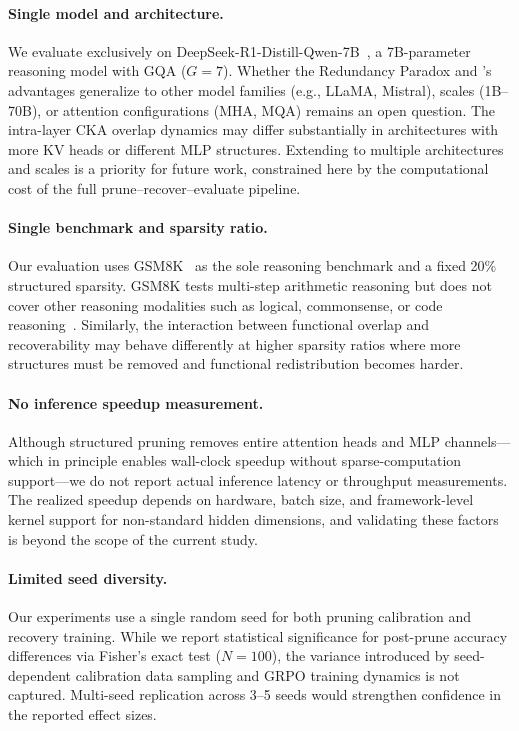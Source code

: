 
\paragraph{Single model and architecture.}
We evaluate \rasp{} exclusively on DeepSeek-R1-Distill-Qwen-7B~\citep{deepseek2025r1}, a 7B-parameter reasoning model with GQA ($G{=}7$).
Whether the Redundancy Paradox and \rasp{}'s advantages generalize to other model families (e.g., LLaMA, Mistral), scales (1B--70B), or attention configurations (MHA, MQA) remains an open question.
The intra-layer CKA overlap dynamics may differ substantially in architectures with more KV heads or different MLP structures.
Extending to multiple architectures and scales is a priority for future work, constrained here by the computational cost of the full prune--recover--evaluate pipeline.

\paragraph{Single benchmark and sparsity ratio.}
Our evaluation uses GSM8K~\citep{cobbe2021gsm8k} as the sole reasoning benchmark and a fixed 20\% structured sparsity.
GSM8K tests multi-step arithmetic reasoning but does not cover other reasoning modalities such as logical, commonsense, or code reasoning~\citep{hendrycks2021mmlu,chen2021humaneval}.
Similarly, the interaction between functional overlap and recoverability may behave differently at higher sparsity ratios where more structures must be removed and functional redistribution becomes harder.

\paragraph{No inference speedup measurement.}
Although structured pruning removes entire attention heads and MLP channels---which in principle enables wall-clock speedup without sparse-computation support---we do not report actual inference latency or throughput measurements.
The realized speedup depends on hardware, batch size, and framework-level kernel support for non-standard hidden dimensions, and validating these factors is beyond the scope of the current study.

\paragraph{Limited seed diversity.}
Our experiments use a single random seed for both pruning calibration and recovery training.
While we report statistical significance for post-prune accuracy differences via Fisher's exact test ($N{=}100$), the variance introduced by seed-dependent calibration data sampling and GRPO training dynamics is not captured.
Multi-seed replication across 3--5 seeds would strengthen confidence in the reported effect sizes.
